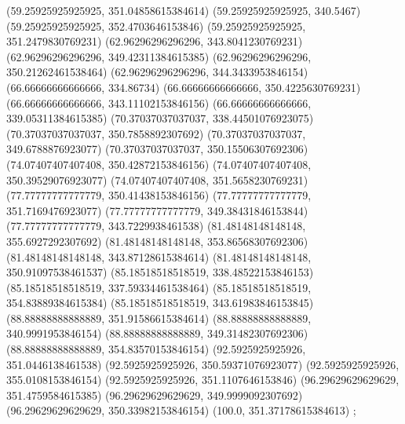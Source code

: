 {{{		(59.25925925925925, 351.04858615384614)
		(59.25925925925925, 340.5467)
		(59.25925925925925, 352.4703646153846)
		(59.25925925925925, 351.2479830769231)
		(62.96296296296296, 343.8041230769231)
		(62.96296296296296, 349.42311384615385)
		(62.96296296296296, 350.21262461538464)
		(62.96296296296296, 344.3433953846154)
		(66.66666666666666, 334.86734)
		(66.66666666666666, 350.4225630769231)
		(66.66666666666666, 343.11102153846156)
		(66.66666666666666, 339.05311384615385)
		(70.37037037037037, 338.44501076923075)
		(70.37037037037037, 350.7858892307692)
		(70.37037037037037, 349.6788876923077)
		(70.37037037037037, 350.15506307692306)
		(74.07407407407408, 350.42872153846156)
		(74.07407407407408, 350.39529076923077)
		(74.07407407407408, 351.5658230769231)
		(77.77777777777779, 350.41438153846156)
		(77.77777777777779, 351.7169476923077)
		(77.77777777777779, 349.38431846153844)
		(77.77777777777779, 343.7229938461538)
		(81.48148148148148, 355.6927292307692)
		(81.48148148148148, 353.86568307692306)
		(81.48148148148148, 343.87128615384614)
		(81.48148148148148, 350.91097538461537)
		(85.18518518518519, 338.48522153846153)
		(85.18518518518519, 337.59334461538464)
		(85.18518518518519, 354.83889384615384)
		(85.18518518518519, 343.61983846153845)
		(88.88888888888889, 351.91586615384614)
		(88.88888888888889, 340.9991953846154)
		(88.88888888888889, 349.31482307692306)
		(88.88888888888889, 354.83570153846154)
		(92.5925925925926, 351.0446138461538)
		(92.5925925925926, 350.59371076923077)
		(92.5925925925926, 355.0108153846154)
		(92.5925925925926, 351.1107646153846)
		(96.29629629629629, 351.4759584615385)
		(96.29629629629629, 349.9999092307692)
		(96.29629629629629, 350.33982153846154)
		(100.0, 351.37178615384613)
	};

}}
